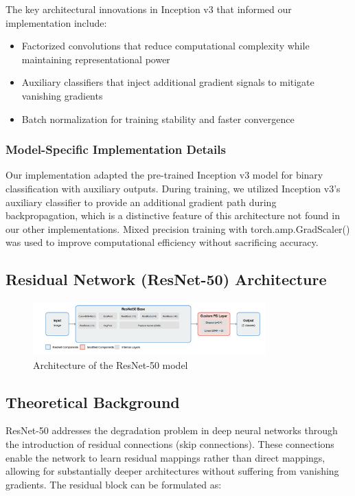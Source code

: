 \documentclass[a4paper,12pt]{report}
\begin{document}
The key architectural innovations in Inception v3 that informed our implementation include:
\begin{itemize}
    \item Factorized convolutions that reduce computational complexity while maintaining representational power
    \item Auxiliary classifiers that inject additional gradient signals to mitigate vanishing gradients
    \item Batch normalization for training stability and faster convergence

\end{itemize}

\subsubsection{Model-Specific Implementation Details}

Our implementation adapted the pre-trained Inception v3 model for binary classification with auxiliary outputs. During training, we utilized Inception v3's auxiliary classifier to provide an additional gradient path during backpropagation, which is a distinctive feature of this architecture not found in our other implementations. Mixed precision training with torch.amp.GradScaler() was used to improve computational efficiency without sacrificing accuracy.

\subsection{Residual Network (ResNet-50) Architecture}

\begin{figure}[H]
    \centering
    \includegraphics[width=0.8\textwidth]{images/architecture/resnet.png}
    \caption{Architecture of the ResNet-50 model}
    \label{fig:resnet_architecture}
\end{figure}

\subsection*{Theoretical Background}

ResNet-50 \citep{he2016deep} addresses the degradation problem in deep neural networks through the introduction of residual connections (skip connections). These connections enable the network to learn residual mappings rather than direct mappings, allowing for substantially deeper architectures without suffering from vanishing gradients. The residual block can be formulated as:
\end{document}
